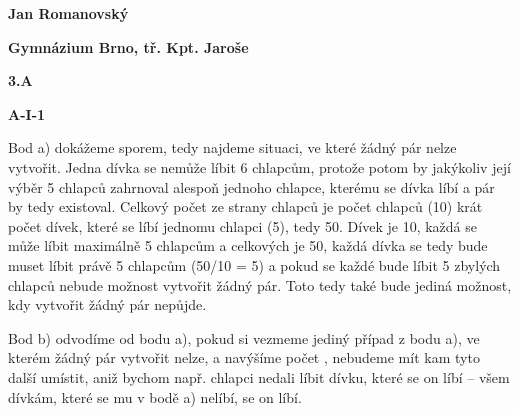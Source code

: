 \documentclass{article}
\title{\vspace{-2cm}\vspace{-1.7cm}}
\date{}
\author{}
\begin{document}
\maketitle
\noindent \textbf{Jan Romanovský}

\noindent \textbf{Gymnázium Brno, tř. Kpt. Jaroše}

\noindent \textbf{3.A}

\noindent \textbf{A-\textrm{I}-1}

\textbf{ }

Bod a) dokážeme sporem, tedy najdeme situaci, ve které žádný pár nelze vytvořit. Jedna dívka se nemůže líbit 6 chlapcům, protože potom by jakýkoliv její výběr 5 chlapců zahrnoval alespoň jednoho chlapce, kterému se dívka líbí a pár by tedy existoval. Celkový počet  ze strany chlapců je počet chlapců (10) krát počet dívek, které se líbí jednomu chlapci (5), tedy 50. Dívek je 10, každá se může líbit maximálně 5 chlapcům a celkových  je 50, každá dívka se tedy bude muset líbit právě 5 chlapcům (50/10 = 5) a pokud se každé bude líbit 5 zbylých chlapců nebude možnost vytvořit žádný pár. Toto tedy také bude jediná možnost, kdy vytvořit žádný pár nepůjde.

Bod b) odvodíme od bodu a), pokud si vezmeme jediný případ z bodu a), ve kterém žádný pár vytvořit nelze, a navýšíme počet , nebudeme mít kam tyto další umístit, aniž bychom např. chlapci nedali líbit dívku, které se on líbí -- všem dívkám, které se mu v bodě a) nelíbí, se on líbí.
\end{document}
